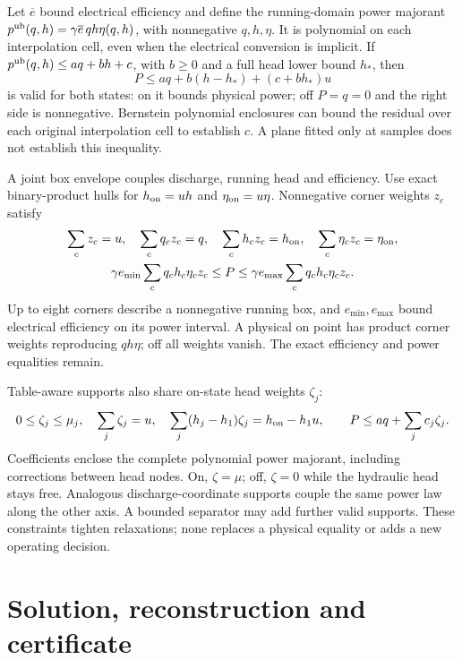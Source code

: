 \documentclass[10pt,a4paper]{article}
\begin{document}
Let $\overline e$ bound electrical efficiency and define the running-domain
power majorant $p^{\rm ub}(q,h)=\gamma\overline e\,qh\eta(q,h)$,
with nonnegative $q,h,\eta$. It is polynomial on each interpolation cell,
even when the electrical conversion is implicit.
If $p^{\rm ub}(q,h)\le aq+bh+c$, with $b\ge0$ and a full head lower bound $h_*$, then
\begin{equation}
P\le aq+b(h-h_*)+(c+bh_*)u
\label{eq:support}
\end{equation}
is valid for both states: on it bounds physical power; off $P=q=0$
and the right side is nonnegative. Bernstein polynomial enclosures can
bound the residual over each original interpolation cell to establish $c$.
A plane fitted only at samples does not establish this inequality.

A joint box envelope couples discharge, running head and efficiency.
Use exact binary-product hulls for $h_{\rm on}=uh$ and
$\eta_{\rm on}=u\eta$. Nonnegative corner weights $z_c$ satisfy
\begin{equation}
\begin{gathered}
\sum_c z_c=u,\quad \sum_c q_cz_c=q,\quad
\sum_c h_cz_c=h_{\rm on},\quad
\sum_c\eta_cz_c=\eta_{\rm on},\\
\gamma e_{\min}\sum_c q_ch_c\eta_cz_c
\le P\le\gamma e_{\max}\sum_c q_ch_c\eta_cz_c.
\end{gathered}
\label{eq:box}
\end{equation}
Up to eight corners describe a nonnegative running box, and
$e_{\min},e_{\max}$ bound electrical efficiency on its power interval.
A physical on point has product corner weights reproducing $qh\eta$;
off all weights vanish. The exact efficiency and power equalities remain.

Table-aware supports also share on-state head weights $\zeta_j$:
\begin{equation}
0\le\zeta_j\le\mu_j,\quad \sum_j\zeta_j=u,\quad
\sum_j(h_j-h_1)\zeta_j=h_{\rm on}-h_1u,\qquad
P\le aq+\sum_j c_j\zeta_j .
\label{eq:coordinatecuts}
\end{equation}
Coefficients enclose the complete polynomial power majorant, including corrections
between head nodes. On, $\zeta=\mu$; off, $\zeta=0$ while the hydraulic
head stays free. Analogous discharge-coordinate supports couple the same
power law along the other axis. A bounded separator may add further valid
supports. These constraints tighten relaxations; none replaces a physical
equality or adds a new operating decision.

\section{Solution, reconstruction and certificate}
\end{document}
